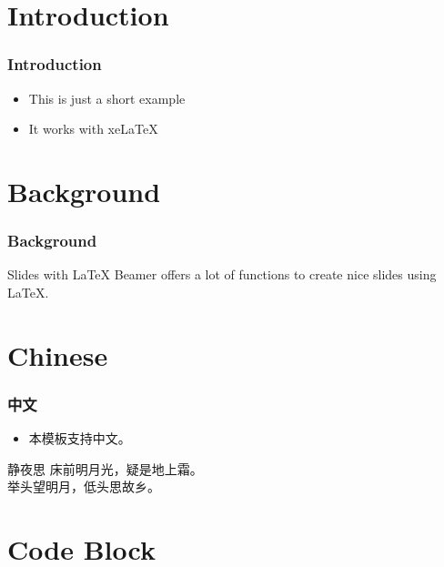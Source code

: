 \frame[plain]{\titlepage}

\section{Introduction}

\begin{frame}
  \frametitle{Introduction}

  \begin{itemize}
  \item<1-> This is just a short example
  \item<2-> It works with xeLaTeX
  \end{itemize}
\end{frame}

\section{Background}

\begin{frame}
  \frametitle{Background}

  \begin{block}{Slides with \LaTeX}
    Beamer offers a lot of functions to create nice slides using \LaTeX.
  \end{block}

\end{frame}

\section{Chinese}

\begin{frame}
  \frametitle{中文}

  \begin{itemize}
  \item 本模板支持中文。
  \end{itemize}

\begin{block}{静夜思}
  床前明月光，疑是地上霜。\\
  举头望明月，低头思故乡。
\end{block}
\end{frame}

\section{Code Block}

